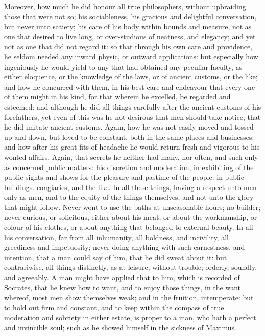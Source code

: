 Moreover, how much he did honour all true philosophers, without upbraiding
those that were not so; his sociableness, his gracious and delightful
conversation, but never unto satiety; his care of his body within bounds
and measure, not as one that desired to live long, or over-studious of
neatness, and elegancy; and yet not as one that did not regard it: so that
through his own care and providence, he seldom needed any inward physic,
or outward applications: but especially how ingeniously he would yield to
any that had obtained any peculiar faculty, as either eloquence, or the
knowledge of the laws, or of ancient customs, or the like; and how he
concurred with them, in his best care and endeavour that every one of them
might in his kind, for that wherein he excelled, be regarded and esteemed:
and although he did all things carefully after the ancient customs of his
forefathers, yet even of this was he not desirous that men should take
notice, that he did imitate ancient customs. Again, how he was not easily
moved and tossed up and down, but loved to be constant, both in the same
places and businesses; and how after his great fits of headache he would
return fresh and vigorous to his wonted affairs. Again, that secrets he
neither had many, nor often, and such only as concerned public matters:
his discretion and moderation, in exhibiting of the public sights and
shows for the pleasure and pastime of the people: in public buildings.
congiaries, and the like. In all these things, having a respect unto men
only as men, and to the equity of the things themselves, and not unto the
glory that might follow. Never wont to use the baths at unseasonable
hours; no builder; never curious, or solicitous, either about his meat, or
about the workmanship, or colour of his clothes, or about anything that
belonged to external beauty. In all his conversation, far from all
inhumanity, all boldness, and incivility, all greediness and impetuosity;
never doing anything with such earnestness, and intention, that a man
could say of him, that he did sweat about it: but contrariwise, all things
distinctly, as at leisure; without trouble; orderly, soundly, and
agreeably. A man might have applied that to him, which is recorded of
Socrates, that he knew how to want, and to enjoy those things, in the want
whereof, most men show themselves weak; and in the fruition, intemperate:
but to hold out firm and constant, and to keep within the compass of true
moderation and sobriety in either estate, is proper to a man, who hath a
perfect and invincible soul; such as he showed himself in the sickness of
Maximus.

